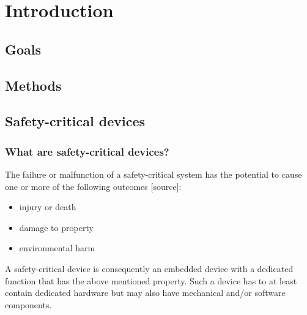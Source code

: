 
\chapter{Introduction} %

\label{Chapter1} %


\newcommand{\keyword}[1]{\textbf{#1}}
\newcommand{\tabhead}[1]{\textbf{#1}}
\newcommand{\code}[1]{\texttt{#1}}
\newcommand{\file}[1]{\texttt{\bfseries#1}}
\newcommand{\option}[1]{\texttt{\itshape#1}}

\newcommand{\mfg}{manufacturer}

\section{Goals}


\section{Methods}


\section{Safety-critical devices}
\subsection{What are safety-critical devices?}
The failure or malfunction of a safety-critical system has the potential to cause one or more of the following outcomes [source]:
\begin{itemize}
\item injury or death
\item damage to property
\item environmental harm
\end{itemize}
A safety-critical device is consequently an embedded device with a dedicated function that has the above mentioned property. Such a device has to at least contain dedicated hardware but may also have mechanical and/or software components.


